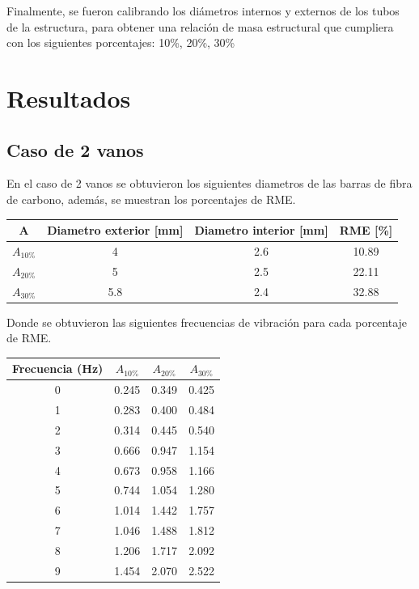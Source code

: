 Finalmente, se fueron calibrando los diámetros internos y externos de los tubos de la estructura, para obtener una relación de masa estructural que cumpliera con los siguientes porcentajes: 10\%, 20\%, 30\%


\section{Resultados}


\subsection{Caso de 2 vanos}
En el caso de 2 vanos se obtuvieron los siguientes diametros de las barras de fibra de carbono, además, se muestran los porcentajes de RME.

\begin{table}[H]
    \centering
    \begin{tabular}{cccc}
    \toprule
     A & Diametro exterior [mm] & Diametro interior [mm] & RME [\%] \\
    \midrule
     $A_{10\%}$ &  4 &  2.6 &  10.89 \\
     $A_{20\%}$ &  5 &  2.5 &  22.11 \\
     $A_{30\%}$ &  5.8 &  2.4 &  32.88 \\
    \bottomrule
    \end{tabular}
\end{table}

Donde se obtuvieron las siguientes frecuencias de vibración para cada porcentaje de RME.

\begin{table}[H]
    \centering
    \begin{tabular}{cccc}
    \toprule
     Frecuencia (Hz) & $A_{10\%}$ & $A_{20\%}$ & $A_{30\%}$ \\
    \midrule
     0 &  0.245 &  0.349 &  0.425 \\
     1 &  0.283 &  0.400 &  0.484 \\
     2 &  0.314 &  0.445 &  0.540 \\
     3 &  0.666 &  0.947 &  1.154 \\
     4 &  0.673 &  0.958 &  1.166 \\
     5 &  0.744 &  1.054 &  1.280 \\
     6 &  1.014 &  1.442 &  1.757 \\
     7 &  1.046 &  1.488 &  1.812 \\
     8 &  1.206 &  1.717 &  2.092 \\
     9 &  1.454 &  2.070 &  2.522 \\
    \bottomrule
    \end{tabular}
\end{table}

